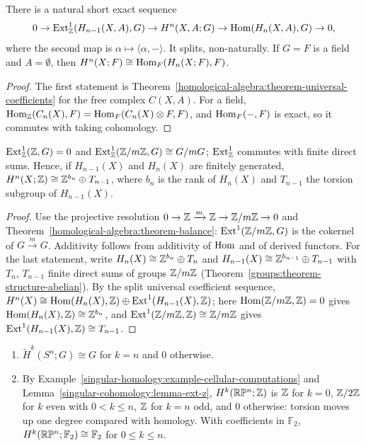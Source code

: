 \begin{theorem}\label{singular-cohomology:theorem-universal-coefficients}
There is a natural short exact sequence
\[
0 \to \operatorname{Ext}^1_{\mathbb{Z}}(H_{n-1}(X, A), G) \to H^n(X, A; G) \to \operatorname{Hom}(H_n(X, A), G) \to 0,
\]
where the second map is $\alpha \mapsto \langle \alpha, - \rangle$. It splits, non-naturally. If $G = F$ is a field and $A = \emptyset$, then
$H^n(X; F) \cong \operatorname{Hom}_F(H_n(X; F), F)$.
\end{theorem}

\begin{proof}
The first statement is Theorem~\ref{homological-algebra:theorem-universal-coefficients} for the free complex $C(X, A)$. For a field,
$\operatorname{Hom}_{\mathbb{Z}}(C_n(X), F) = \operatorname{Hom}_F(C_n(X) \otimes F, F)$, and $\operatorname{Hom}_F(-, F)$ is exact, so it commutes with taking cohomology.
\end{proof}

\begin{lemma}\label{singular-cohomology:lemma-ext-z}
$\operatorname{Ext}^1_{\mathbb{Z}}(\mathbb{Z}, G) = 0$ and $\operatorname{Ext}^1_{\mathbb{Z}}(\mathbb{Z}/m\mathbb{Z}, G) \cong G/mG$; $\operatorname{Ext}^1_{\mathbb{Z}}$ commutes with finite direct sums. Hence, if $H_{n-1}(X)$ and $H_n(X)$ are finitely generated,
$H^n(X; \mathbb{Z}) \cong \mathbb{Z}^{b_n} \oplus T_{n-1}$, where $b_n$ is the rank of $H_n(X)$ and $T_{n-1}$ the torsion subgroup of $H_{n-1}(X)$.
\end{lemma}

\begin{proof}
Use the projective resolution $0 \to \mathbb{Z} \xrightarrow{m} \mathbb{Z} \to \mathbb{Z}/m\mathbb{Z} \to 0$ and Theorem~\ref{homological-algebra:theorem-balance}: $\operatorname{Ext}^1(\mathbb{Z}/m\mathbb{Z}, G)$ is the cokernel of
$G \xrightarrow{m} G$. Additivity follows from additivity of $\operatorname{Hom}$ and of derived functors. For the last statement, write $H_n(X) \cong \mathbb{Z}^{b_n} \oplus T_n$ and $H_{n-1}(X) \cong \mathbb{Z}^{b_{n-1}} \oplus T_{n-1}$ with $T_n$, $T_{n-1}$ finite direct sums of groups
$\mathbb{Z}/m\mathbb{Z}$ (Theorem~\ref{groups:theorem-structure-abelian}). By the split universal coefficient sequence,
$H^n(X) \cong \operatorname{Hom}(H_n(X), \mathbb{Z}) \oplus \operatorname{Ext}^1(H_{n-1}(X), \mathbb{Z})$; here $\operatorname{Hom}(\mathbb{Z}/m\mathbb{Z}, \mathbb{Z}) = 0$ gives $\operatorname{Hom}(H_n(X), \mathbb{Z}) \cong \mathbb{Z}^{b_n}$, and
$\operatorname{Ext}^1(\mathbb{Z}/m\mathbb{Z}, \mathbb{Z}) \cong \mathbb{Z}/m\mathbb{Z}$ gives $\operatorname{Ext}^1(H_{n-1}(X), \mathbb{Z}) \cong T_{n-1}$.
\end{proof}

\begin{example}\label{singular-cohomology:example-cohomology-groups}
\begin{enumerate}
\item $\tilde{H}^k(S^n; G) \cong G$ for $k = n$ and $0$ otherwise.
\item By Example~\ref{singular-homology:example-cellular-computations} and Lemma~\ref{singular-cohomology:lemma-ext-z}, $H^k(\mathbb{R}\mathbb{P}^n; \mathbb{Z})$ is $\mathbb{Z}$ for $k = 0$, $\mathbb{Z}/2\mathbb{Z}$ for
$k$ even with $0 < k \leq n$, $\mathbb{Z}$ for $k = n$ odd, and $0$ otherwise: torsion moves up one degree compared with homology. With coefficients in $\mathbb{F}_2$,
$H^k(\mathbb{R}\mathbb{P}^n; \mathbb{F}_2) \cong \mathbb{F}_2$ for $0 \leq k \leq n$.
\end{enumerate}
\end{example}

